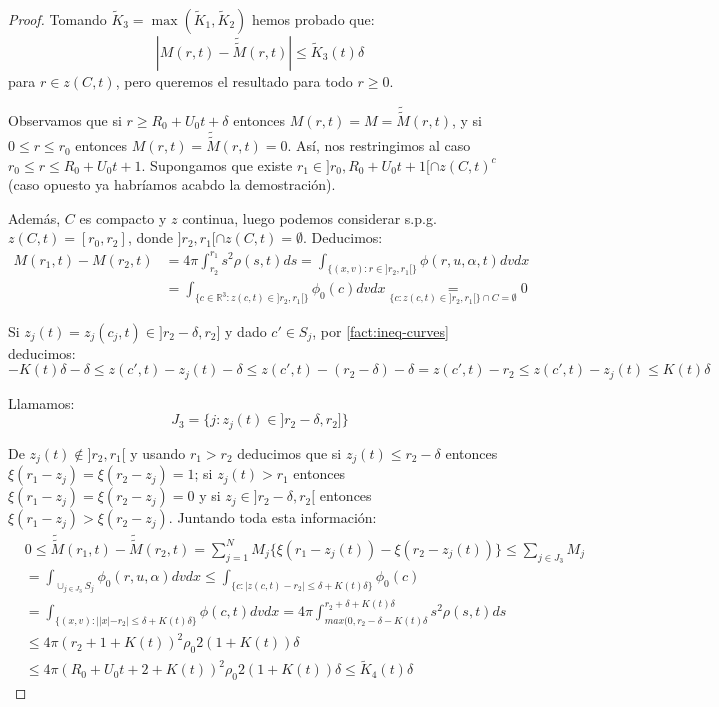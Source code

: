 \documentclass[a4paper,10pt]{scrartcl}
\theoremstyle{definition}
\newcommand{\ktilde}{\widetilde{K}}
\newcommand{\dtilde}[1]{\widetilde{\widetilde{#1}}}
\numberwithin{equation}{section}
\begin{document}
\begin{proof}
 Tomando $\ktilde_3 = \max(\ktilde_1, \ktilde_2)$ hemos probado que:
 \begin{equation}
 |M(r,t) - \dtilde{M}(r,t)| \le \ktilde_3(t) \delta
 \label{eqn:m-mdtilde1}
 \end{equation}
 para $r \in z(C,t)$, pero queremos el resultado para todo $r\ge 0$.
 
 Observamos que si $r \ge R_0 + U_0 t + \delta$ entonces $M(r,t) = M = \dtilde{M}(r,t)$, y si $0\le r \le r_0$ entonces $M(r,t) = \dtilde{M}(r,t) = 0$. Así, nos restringimos al caso $r_0 \le r \le R_0 + U_0t + 1$. Supongamos que existe $r_1 \in ]r_0, R_0 + U_0t + 1[ \cap z(C, t)^c$ (caso opuesto ya habríamos acabdo la demostración).
 
 Además, $C$ es compacto y $z$ continua, luego podemos considerar s.p.g. $z(C,t) = [r_0, r_2]$, donde $]r_2,r_1[ \cap z(C,t) = \emptyset$.
 Deducimos:
 \begin{align}
  M(r_1, t) - M(r_2, t) &= 4\pi\int_{r_2}^{r_1} s^2 \rho(s,t) ds = \int_{\{(x,v): r\in ]r_2, r_1[\}} \phi(r,u,\alpha,t) dv dx \nonumber\\
  &= \int_{\{c\in\mathbb{R}^3: z(c,t) \in ]r_2, r_1[\}} \phi_0(c) dv dx
  \underset{\{c: z(c,t) \in ]r_2,r_1[\} \cap C = \emptyset}{=} 0
  \label{eqn:mdiff}
 \end{align}
 
 Si $z_j(t) = z_j(c_j,t) \in ]r_2 - \delta, r_2]$ y dado $c'\in S_j$, por \cref{fact:ineq-curves} deducimos:
 \[
 -K(t)\delta -\delta \le z(c',t) - z_j(t) - \delta \le z(c',t) - (r_2 - \delta) - \delta = z(c',t) - r_2 \le z(c',t) - z_j(t) \le K(t)\delta
 \]
 
 Llamamos:
 \[
 J_3 = \{j: z_j(t) \in ]r_2 - \delta, r_2]\}
 \]
 
 De $z_j(t) \notin ]r_2,r_1[$ y usando $r_1 > r_2$ deducimos que si $z_j(t) \le r_2 - \delta$ entonces $\xi(r_1 - z_j) = \xi(r_2 - z_j) = 1$; si $z_j(t) > r_1$ entonces $\xi(r_1 - z_j) = \xi(r_2 - z_j) = 0$ y si $z_j \in ]r_2 - \delta, r_2[$ entonces $\xi(r_1 - z_j) > \xi(r_2 - z_j)$. Juntando toda esta información:
 \begin{align}
 &0 \le \dtilde{M}(r_1,t) - \dtilde{M}(r_2,t) = \sum_{j=1}^N M_j \bigg\{\xi(r_1 - z_j(t)) - \xi(r_2 - z_j(t))\bigg\} \le \sum_{j \in J_3} M_j \nonumber\\ 
 &=\int_{\cup_{j\in J_3} S_j} \phi_0(r,u,\alpha) dv dx \le \int_{\{c : |z(c,t) - r_2| \le \delta + K(t) \delta\}} \phi_0(c) \nonumber\\
 &= \int_{\{(x,v): ||x| - r_2| \le \delta + K(t) \delta\}} \phi(c,t) dv dx = 4\pi \int_{max(0, r_2 - \delta - K(t)\delta}^{r_2 + \delta + K(t) \delta} s^2 \rho(s,t) ds \nonumber\\
 &\le 4\pi (r_2 + 1 + K(t))^2 \rho_0 2(1+ K(t))\delta \nonumber\\
 &\le 4\pi (R_0 + U_0t + 2 + K(t))^2 \rho_0 2 (1 + K(t))\delta \le \ktilde_4(t)\delta
 \label{eqn:mtildediff}
 \end{align}


\end{proof}
\end{document}
